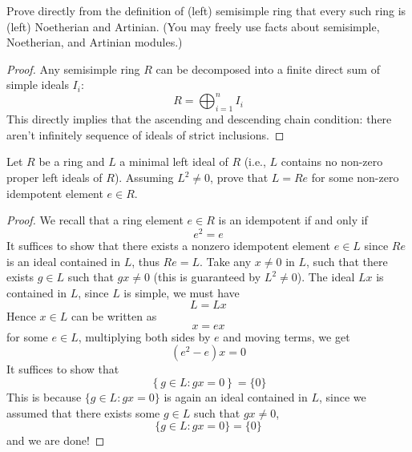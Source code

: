 \begin{prob}[S2017-Q5]
    Prove directly from the definition of (left) semisimple ring that every such
ring is (left) Noetherian and Artinian. (You may freely use facts about
semisimple, Noetherian, and Artinian modules.)
\end{prob}
\begin{proof}
    Any semisimple ring $R$ can be decomposed into a finite direct sum of simple ideals $I_i$:
    \begin{equation*}
        R=\bigoplus_{i=1}^nI_i
    \end{equation*}
    This directly implies that the ascending and descending chain condition: there aren't infinitely sequence of ideals of strict inclusions.
\end{proof}





\begin{prob}[S2005-Q4]
    Let \( R \) be a ring and \( L \) a minimal left ideal of \( R \) (i.e., \( L \) contains no non-zero proper left ideals of \( R \)). Assuming \( L^2 \neq 0 \), prove that \( L = Re \) for some non-zero idempotent element \( e \in R \).
\end{prob}
\begin{proof}
    We recall that a ring element $e\in R$ is an idempotent if and only if 
    \begin{equation*}
        e^2=e
    \end{equation*}
    It suffices to show that there exists a nonzero idempotent element $e\in L$ since $Re$ is an ideal contained in $L$, thus $Re=L$. Take any $x\neq 0$ in $L$, such that there exists $g\in L$ such that $gx\neq 0$ (this is guaranteed by $L^2\neq 0$). The ideal $Lx$ is contained in $L$, since $L$ is simple, we must have 
    \begin{equation*}
        L=Lx
    \end{equation*}
    Hence $x\in L$ can be written as 
    \begin{equation*}
        x=ex
    \end{equation*}
    for some $e\in L$, multiplying both sides by $e$ and moving terms, we get 
    \begin{equation*}
        (e^2-e)x=0
    \end{equation*}
    It suffices to show that 
    \begin{equation*}
        \left\{g\in L: gx=0\right\}=\{0\}
    \end{equation*}
    This is because $\{g\in L: gx=0\}$ is again an ideal contained in $L$, since we assumed that there exists some $g\in L$ such that $gx\neq 0$, 
    \begin{equation*}
        \{g\in L:gx=0\}=\{0\}
    \end{equation*}
    and we are done!
\end{proof}



